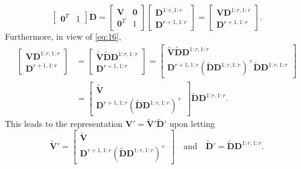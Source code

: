 \documentclass[11pt,a4paper]{article}
\theoremstyle{mybreak}
\numberwithin{dummy}{section}
\theoremstyle{plain}
\theoremstyle{plain}
\theoremstyle{plain}
\theoremstyle{plain}
\theoremstyle{MyNonumberplain}
\newcommand{\0}{\M{0}}
\newcommand{\M}[1]{\mathbf{#1}}
\newcommand{\Mt}[1]{\tilde{\M{#1}}}
\begin{document}
\begin{enumerate}[font=\upshape,label=(\roman*),wide,align=right]
\begin{displaymath}
\begin{bmatrix}
      \0^T & 1
    \end{bmatrix}
    \M{D}
    =
    \begin{bmatrix}
      \M{V} & \0
      \\
      \0^T & 1
    \end{bmatrix}
    \begin{bmatrix}
      \M{D}^{1:r,1:r}
      \\
      \M{D}^{r+1,1:r}
    \end{bmatrix}
    =
    \begin{bmatrix}
      \M{V} \M{D}^{1:r,1:r}
      \\
      \M{D}^{r+1,1:r}
    \end{bmatrix}.
  \end{displaymath}
Furthermore, in view of \eqref{eq:16},  
\begin{align*}
    \begin{bmatrix}
      \M{V} \M{D}^{1:r,1:r}
      \\
      \M{D}^{r+1,1:r}
    \end{bmatrix}
  & =
  \begin{bmatrix}
    \Mt{V} \Mt{D} \M{D}^{1:r,1:r}
    \\
    \M{D}^{r+1,1:r}
  \end{bmatrix}
  =
  \begin{bmatrix}
    \Mt{V} \Mt{D} \M{D}^{1:r, 1:r}
    \\
    \M{D}^{r+1, 1:r} \left(\Mt{D} \M{D}^{1:r,1:r} \right)^+ \Mt{D} \M{D}^{1:r, 1:r}
  \end{bmatrix}
  \\
  & =
    \begin{bmatrix}
      \Mt{V}
      \\
      \M{D}^{r+1, 1:r} \left(\Mt{D} \M{D}^{1:r,1:r} \right)^+
    \end{bmatrix}
  \Mt{D} \M{D}^{1:r, 1:r}.
\end{align*}
This leads to the representation
\begin{math}
  \M{V}' =  \Mt{V}' \Mt{D}'
\end{math}
upon letting
\begin{displaymath}
  \Mt{V}' =
  \begin{bmatrix}
    \Mt{V}
    \\
    \M{D}^{r+1, 1:r} \left(\Mt{D} \M{D}^{1:r,1:r} \right)^+
  \end{bmatrix}
  \quad
  \text{and}
  \quad
  \Mt{D}' =
  \Mt{D} \M{D}^{1:r, 1:r}.
\end{displaymath}
\end{enumerate}
\end{document}
